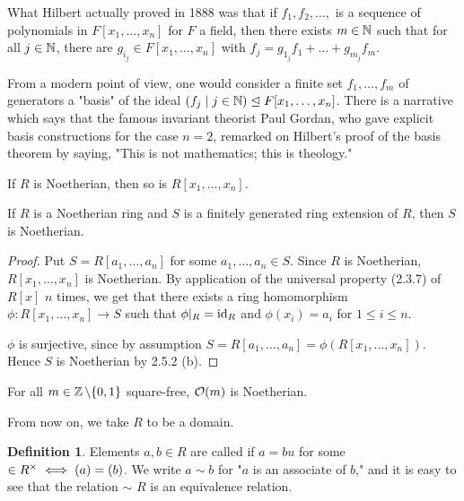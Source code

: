 \documentclass[11pt]{book}
\theoremstyle{definition}   \newtheorem{defn}[counter]{Definition} %
\newcommand{\bs}{\backslash}   \newcommand{\A}{\mathcal{A}}   \newcommand{\sy}{\textnormal{Syl}}   \newcommand{\size}[1]{\left| #1 \right|}
\newcommand{\nsg}{\mathrel{\unlhd}}   \newcommand{\ind}{\parindent24pt}   \newcommand{\vn}{\varnothing}
\DeclareMathOperator{\ra}{\rightarrow}   \DeclareMathOperator{\Poly}{\mathbf{P}}   \DeclareMathOperator{\spn}{\textnormal{span}}   \DeclareMathOperator{\aut}{\textnormal{Aut}}
\newcommand{\vs}{\vspace{8pt}}
\numberwithin{counter}{chapter}
\begin{document}
\vs

\begin{remark*}
What Hilbert actually proved in 1888 was that if $f_1,f_2,\dots,$ is a sequence of polynomials in $F[x_1,\dots,x_n]$ for $F$ a field, then there exists $m \in \operatorname{\mathbb{N}}$ such that for all $j \in \operatorname{\mathbb{N}}$, there are $g_{i_j} \in F[x_1,\dots,x_n]$ with $f_j = g_{1_j} f_1 + \dots + g_{m_j} f_m$.

From a modern point of view, one would consider a finite set $f_1,\dots,f_m$ of generators a "basis" of the ideal $(f_j \mid j \in \N) \nsg F[x_1,\dots,x_n]$. There is a narrative which says that the famous invariant theorist Paul Gordan, who gave explicit basis constructions for the case $n = 2$, remarked on Hilbert's proof of the basis theorem by saying, "This is not mathematics; this is theology."
\end{remark*}

\vs

\begin{corollary*}
If $R$ is Noetherian, then so is $R[x_1,\dots,x_n]$.
\end{corollary*}

\vs

\begin{corollary}
If $R$ is a Noetherian ring and $S$ is a finitely generated ring extension of $R$, then $S$ is Noetherian.
\end{corollary}

\begin{proof}
Put $S = R[a_1,\dots,a_n]$ for some $a_1,\dots,a_n \in S$. Since $R$ is Noetherian, $R[x_1,\dots,x_n]$ is Noetherian. By application of the universal property (2.3.7) of $R[x]$ $n$ times, we get that there exists a ring homomorphism $\phi : R[x_1,\dots,x_n] \ra S$ such that $\phi|_R = \textnormal{id}_R$ and $\phi(x_i) = a_i$ for $1 \leq i \leq n$.

$\phi$ is surjective, since by assumption $S = R[a_1,\dots,a_n] = \phi(R[x_1,\dots,x_n])$. Hence $S$ is Noetherian by 2.5.2 (b).
\end{proof}

\vs

\begin{example*}
For all $m \in \z\bs\{0,1\}$ square-free, $\mathcal{O}(m)$ is Noetherian.
\end{example*}

\vs

From now on, we take $R$ to be a domain.

\vs

\begin{defn}
Elements $a,b \in R$ are called  if $a = bu$ for some $ \in R^{\times} \iff (a) = (b)$. We write $a \sim b$ for "$a$ is an associate of $b$," and it is easy to see that the relation $\sim$ $R$ is an equivalence relation.
\end{defn}
\end{document}
